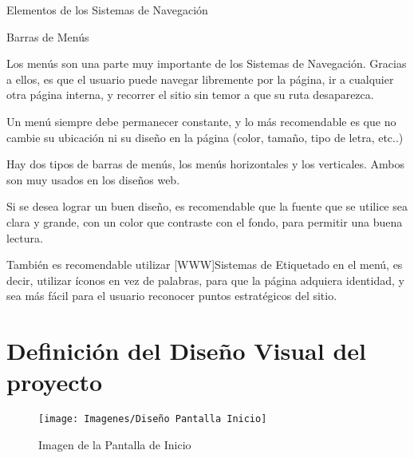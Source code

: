Elementos de los Sistemas de Navegación

Barras de Menús

Los menús son una parte muy importante de los Sistemas de Navegación. Gracias a ellos, es que el usuario puede navegar libremente por la página, ir a cualquier otra página interna, y recorrer el sitio sin temor a que su ruta desaparezca.

Un menú siempre debe permanecer constante, y lo más recomendable es que no cambie su ubicación ni su diseño en la página (color, tamaño, tipo de letra, etc..)

Hay dos tipos de barras de menús, los menús horizontales y los verticales. Ambos son muy usados en los diseños web. 

Si se desea lograr un buen diseño, es recomendable que la fuente que se utilice sea clara y grande, con un color que contraste con el fondo, para permitir una buena lectura. 

También es recomendable utilizar [WWW]Sistemas de Etiquetado en el menú, es decir, utilizar íconos en vez de palabras, para que la página adquiera identidad, y sea más fácil para el usuario reconocer puntos estratégicos del sitio.


\section{Definición del Diseño Visual del proyecto}
\begin{figure}[H]
	\centering
	\texttt{[image: Imagenes/Diseño Pantalla Inicio]}
	\caption{Imagen de la Pantalla de Inicio}
	\label{fig:diseno-pantalla-inicio}
\end{figure}

